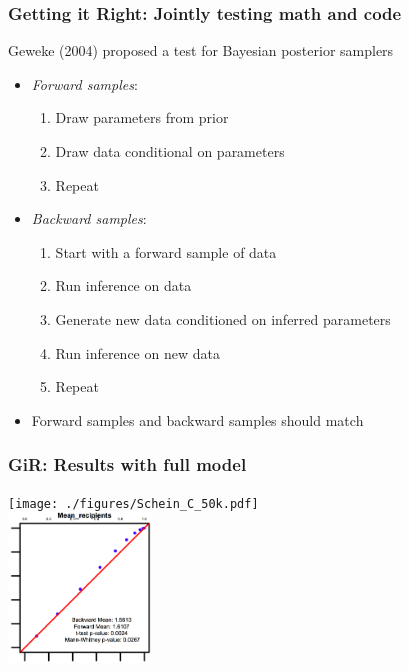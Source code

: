 \documentclass[10pt]{beamer}
\theoremstyle{definition}
\theoremstyle{remark}
\newenvironment{changemargin}[2]{%
  \begin{list}{}{%
    \setlength{\topsep}{0pt}%
    \setlength{\leftmargin}{#1}%
    \setlength{\rightmargin}{#2}%
    \setlength{\listparindent}{\parindent}%
    \setlength{\itemindent}{\parindent}%
    \setlength{\parsep}{\parskip}%
  }%
  \item[]}{\end{list}}
\begin{document}
\begin{frame} \frametitle{Getting it Right: Jointly testing math and code}

Geweke (2004) proposed a test for Bayesian posterior samplers \vspace{.2cm}
\begin{itemize}
\item {\em Forward samples}: 
\begin{enumerate}
\item Draw parameters from prior
\item Draw data conditional on parameters
\item Repeat
\end{enumerate} \vspace{.2cm}
\item {\em Backward samples}: 
\begin{enumerate}
\item Start with a forward sample of data
\item Run inference on data
\item Generate new data conditioned on inferred parameters
\item Run inference on new data
\item Repeat
\end{enumerate} \vspace{.2cm}
\item Forward samples and backward samples should match
\end{itemize}


\end{frame}

\begin{frame} \frametitle{GiR: Results with full model}
\begin{changemargin}{-1cm}{-.5cm}
\vspace{-1.5cm}
\texttt{[image: ./figures/Schein\_C\_50k.pdf]} \\  \vspace{-6cm} \includegraphics[height=4cm, right]{./figures/ScheinFocus}
\end{changemargin}
\end{frame}
\end{document}
